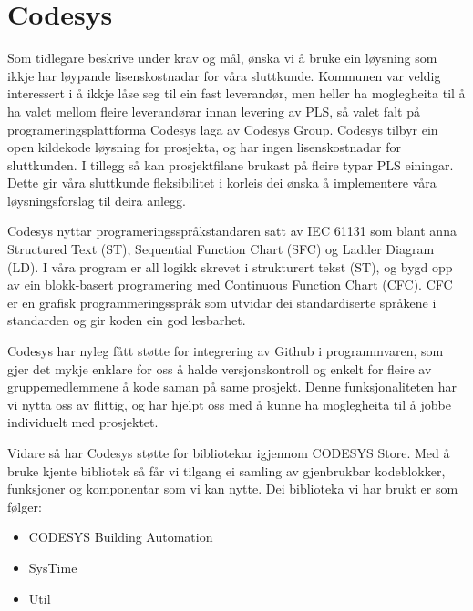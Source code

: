 \section{Codesys}
\thispagestyle{fancy}
Som tidlegare beskrive under krav og mål, ønska vi å bruke ein løysning som ikkje har løypande lisenskostnadar for våra sluttkunde. 
Kommunen var veldig interessert i å ikkje låse seg til ein fast leverandør, men heller ha moglegheita til å ha valet mellom fleire leverandørar innan levering av PLS, så valet falt på programeringsplattforma Codesys\citep{Codesys} laga av Codesys Group. 
Codesys tilbyr ein open kildekode løysning for prosjekta, og har ingen lisenskostnadar for sluttkunden. 
I tillegg så kan prosjektfilane brukast på fleire typar PLS einingar. 
Dette gir våra sluttkunde fleksibilitet i korleis dei ønska å implementere våra løysningsforslag til deira anlegg.

Codesys nyttar programeringsspråkstandaren satt av IEC 61131 som blant anna Structured Text (ST), Sequential Function Chart (SFC) og Ladder Diagram (LD). I våra program er all logikk skrevet i strukturert tekst (ST), og bygd opp av ein blokk-basert programering med Continuous Function Chart (CFC). 
CFC er en grafisk programmeringsspråk som utvidar dei standardiserte språkene i standarden og gir koden ein god lesbarhet.

Codesys har nyleg fått støtte for integrering av Github i programmvaren, som gjer det mykje enklare for oss å halde versjonskontroll og enkelt for fleire av gruppemedlemmene å kode saman på same prosjekt. 
Denne funksjonaliteten har vi nytta oss av flittig, og har hjelpt oss med å kunne ha moglegheita til å jobbe individuelt med prosjektet.

Vidare så har Codesys støtte for bibliotekar igjennom CODESYS Store. 
Med å bruke kjente bibliotek så får vi tilgang ei samling av gjenbrukbar kodeblokker, funksjoner og komponentar som vi kan nytte.
Dei biblioteka vi har brukt er som følger:

\begin{itemize}
    \item CODESYS Building Automation \citep{BuildingAutomation}
    \item SysTime \citep{DateAndTime}
    \item Util \citep{DateAndTime}
\end{itemize}

\newpage
